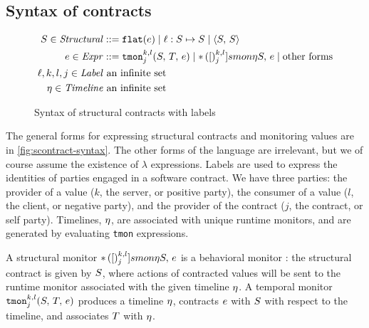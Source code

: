 \subsection{Syntax of contracts}
\begin{figure}
  \begin{align*}
    S \in \mathit{Structural} &::= {\tt flat}(e) \mid \ell : S \mapsto S \mid \langle S,\, S\rangle
\\
    e \in \mathit{Expr} &::= {\tt tmon}{^{k,l}_{j}}({S,\,T,\,e})
                    \mid {\tt *}{\,}({[})^{k,l}_{j}]{smon}{\eta}{S,\, e}
                    \mid \text{other forms}
\\
\ell,k,l,j \in \mathit{Label}&\text{ an infinite set} \\
\eta \in \mathit{Timeline} &\text{ an infinite set}
  \end{align*}
  \caption{Syntax of structural contracts with labels}
  \label{fig:scontract-syntax}
\end{figure}

The general forms for expressing structural contracts and monitoring values are in \autoref{fig:scontract-syntax}.
%
The other forms of the language are irrelevant, but we of course assume the existence of $\lambda$ expressions.
%
Labels are used to express the identities of parties engaged in a software contract.
%
We have three parties: the provider of a value ($k$, the server, or positive party), the consumer of a value ($l$, the client, or negative party), and the provider of the contract ($j$, the contract, or self party).
%
Timelines, $\eta$, are associated with unique runtime monitors, and are generated by evaluating {\tt tmon} expressions.

A structural monitor ${\tt *}{\,}({[})^{k,l}_{j}]{smon}{\eta}{S,\, e}$ is a behavioral monitor \citep{ianjohnson:dthf:complete}: the structural contract is given by $S$, where actions of contracted values will be sent to the runtime monitor associated with the given timeline $\eta$.
%
A temporal monitor ${\tt tmon}{^{k,l}_{j}}({S,\,T,\,e})$ produces a timeline $\eta$, contracts $e$ with $S$ with respect to the timeline, and associates $T$ with $\eta$.

